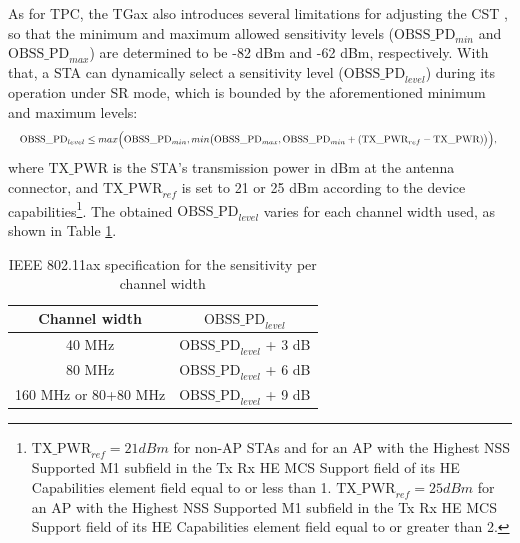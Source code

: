 \documentclass[12pt, a4paper,twoside]{tesi_upf}
\begin{document}
			As for TPC, the TGax also introduces several limitations for adjusting the CST \cite{tgax2016draft}, so that the minimum and maximum allowed sensitivity levels ($\text{OBSS\_PD}_{min}$ and $\text{OBSS\_PD}_{max}$) are determined to be -82 dBm and -62 dBm, respectively. With that, a STA can dynamically select a sensitivity level ($\text{OBSS\_PD}_{level}$) during its operation under SR mode, which is bounded by the aforementioned minimum and maximum levels:			
			\begin{equation}
				\resizebox{1\hsize}{!}{$\text{OBSS\_PD}_{level} \leq max\Big(\text{OBSS\_PD}_{min}, min\big(\text{OBSS\_PD}_{max}, \text{OBSS\_PD}_{min} + (\text{TX\_PWR}_{ref}-\text{TX\_PWR})\big)\Big),$
				\nonumber}				
			\end{equation}
			where $\text{TX\_PWR}$ is the STA's transmission power in dBm at the antenna connector, and $\text{TX\_PWR}_{ref}$ is set to 21 or 25 dBm according to the device capabilities\footnote{$\text{TX\_PWR}_{ref} = 21 dBm$ for non-AP STAs and for an AP with the Highest NSS Supported M1 subfield in the Tx Rx HE MCS Support field of its HE Capabilities element field equal to or less than 1. $\text{TX\_PWR}_{ref} = 25 dBm$ for an AP with the Highest NSS Supported M1 subfield in the Tx Rx HE MCS Support field of its HE Capabilities element field equal to or greater than 2.}.
			The obtained $\text{OBSS\_PD}_{level}$ varies for each channel width used, as shown in Table \ref{tbl:sensitivity_channel_width}.
			\begin{table}[h!]
				\centering
				\begin{tabular}{|c|l|}
					\hline
					\textbf{Channel width} & \multicolumn{1}{c|}{\textbf{$\text{OBSS\_PD}_{level}$}} \\ \hline
					40 MHz                 & $\text{OBSS\_PD}_{level}$ + 3 dB                        \\ \hline
					80 MHz                 & $\text{OBSS\_PD}_{level}$ + 6 dB                        \\ \hline
					160 MHz or 80+80 MHz   & $\text{OBSS\_PD}_{level}$ + 9 dB                        \\ \hline
				\end{tabular}
				\caption{IEEE 802.11ax specification for the sensitivity per channel width}
				\label{tbl:sensitivity_channel_width}
			\end{table}			
		
\end{document}
